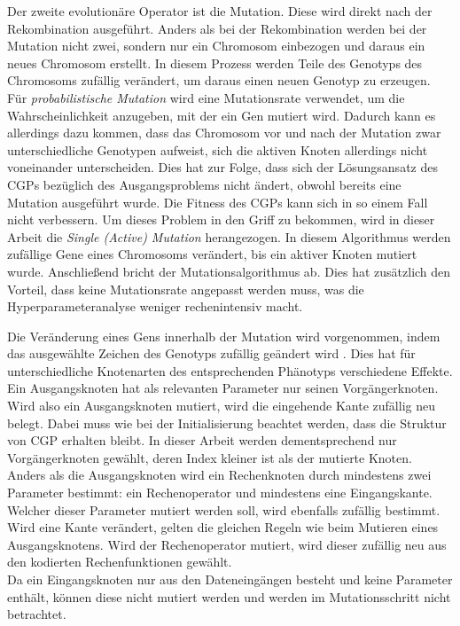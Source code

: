 Der zweite evolutionäre Operator ist die Mutation.
Diese wird direkt nach der Rekombination ausgeführt.
Anders als bei der Rekombination werden bei der Mutation nicht zwei, sondern nur ein Chromosom einbezogen und daraus ein neues Chromosom erstellt.
In diesem Prozess werden Teile des Genotyps des Chromosoms zufällig verändert, um daraus einen neuen Genotyp zu erzeugen. \cite{milad_taleby_ahvanooey_survey_2019}\\
Für \emph{probabilistische Mutation} wird eine Mutationsrate verwendet, um die Wahrscheinlichkeit anzugeben, mit der ein Gen mutiert wird.
Dadurch kann es allerdings dazu kommen, dass das Chromosom vor und nach der Mutation zwar unterschiedliche Genotypen aufweist, sich die aktiven Knoten allerdings nicht voneinander unterscheiden.
Dies hat zur Folge, dass sich der Lösungsansatz des CGPs bezüglich des Ausgangsproblems nicht ändert, obwohl bereits eine Mutation ausgeführt wurde.
Die Fitness des CGPs kann sich in so einem Fall nicht verbessern.
Um dieses Problem in den Griff zu bekommen, wird in dieser Arbeit die \emph{Single (Active) Mutation} herangezogen.
In diesem Algorithmus werden zufällige Gene eines Chromosoms verändert, bis ein aktiver Knoten mutiert wurde.
Anschließend bricht der Mutationsalgorithmus ab. \cite{miller_cartesian_2020}
Dies hat zusätzlich den Vorteil, dass keine Mutationsrate angepasst werden muss, was die Hyperparameteranalyse weniger rechenintensiv macht.

Die Veränderung eines Gens innerhalb der Mutation wird vorgenommen, indem das ausgewählte Zeichen des Genotyps zufällig geändert wird \cite{koza_survey_1995}. 
Dies hat für unterschiedliche Knotenarten des entsprechenden Phänotyps verschiedene Effekte.\\
Ein Ausgangsknoten hat als relevanten Parameter nur seinen Vorgängerknoten.
Wird also ein Ausgangsknoten mutiert, wird die eingehende Kante zufällig neu belegt.
Dabei muss wie bei der Initialisierung beachtet werden, dass die Struktur von CGP erhalten bleibt.
In dieser Arbeit werden dementsprechend nur Vorgängerknoten gewählt, deren Index kleiner ist als der mutierte Knoten.\\
Anders als die Ausgangsknoten wird ein Rechenknoten durch mindestens zwei Parameter bestimmt: ein Rechenoperator und mindestens eine Eingangskante.
Welcher dieser Parameter mutiert werden soll, wird ebenfalls zufällig bestimmt.
Wird eine Kante verändert, gelten die gleichen Regeln wie beim Mutieren eines Ausgangsknotens.
Wird der Rechenoperator mutiert, wird dieser zufällig neu aus den kodierten Rechenfunktionen gewählt.\\
Da ein Eingangsknoten nur aus den Dateneingängen besteht und keine Parameter enthält, können diese nicht mutiert werden und werden im Mutationsschritt nicht betrachtet.

